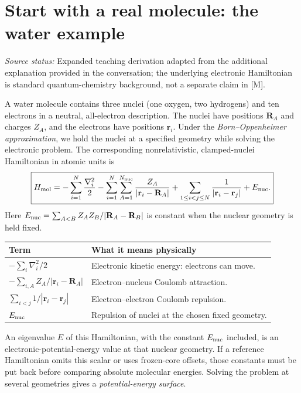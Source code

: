 \documentclass[11pt,a4paper,oneside]{report}
\newcommand{\src}[1]{\par{\small\color{grey}\textit{Source status:} #1}\par}
\begin{document}
\section{Start with a real molecule: the water example}
\src{Expanded teaching derivation adapted from the additional explanation provided in the conversation; the underlying electronic Hamiltonian is standard quantum-chemistry background, not a separate claim in [M].}

A water molecule contains three nuclei (one oxygen, two hydrogens) and ten electrons in a neutral, all-electron description. The nuclei have positions $\mathbf R_A$ and charges $Z_A$, and the electrons have positions $\mathbf r_i$. Under the \emph{Born--Oppenheimer approximation}, we hold the nuclei at a specified geometry while solving the electronic problem. The corresponding nonrelativistic, clamped-nuclei Hamiltonian in atomic units is
\begin{equation}\label{eq:coordinateH}
\boxed{\displaystyle
H_{\rm mol}=-\sum_{i=1}^{N}\frac{\nabla_i^2}{2}
-\sum_{i=1}^{N}\sum_{A=1}^{N_{\rm nuc}}\frac{Z_A}{|\mathbf r_i-\mathbf R_A|}
+\sum_{1\le i<j\le N}\frac1{|\mathbf r_i-\mathbf r_j|}
+E_{\rm nuc}.}
\end{equation}
Here $E_{\rm nuc}=\sum_{A<B}Z_AZ_B/|\mathbf R_A-\mathbf R_B|$ is constant when the nuclear geometry is held fixed.

\begin{center}
\small
\begin{tabularx}{\linewidth}{@{}p{58mm}Y@{}}
\toprule
Term & What it means physically\\\midrule
$-\sum_i\nabla_i^2/2$ & Electronic kinetic energy: electrons can move.\\
$-\sum_{i,A}Z_A/|\mathbf r_i-\mathbf R_A|$ & Electron--nucleus Coulomb attraction.\\
$\sum_{i<j}1/|\mathbf r_i-\mathbf r_j|$ & Electron--electron Coulomb repulsion.\\
$E_{\rm nuc}$ & Repulsion of nuclei at the chosen fixed geometry.\\\bottomrule
\end{tabularx}
\end{center}

An eigenvalue $E$ of this Hamiltonian, with the constant $E_{\rm nuc}$ included, is an electronic-potential-energy value at that nuclear geometry. If a reference Hamiltonian omits this scalar or uses frozen-core offsets, those constants must be put back before comparing absolute molecular energies. Solving the problem at several geometries gives a \emph{potential-energy surface}.
\end{document}
